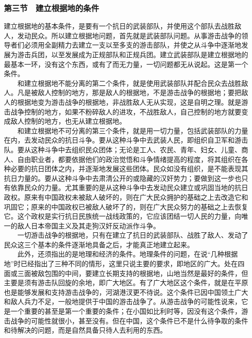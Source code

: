 \documentclass[cn,11pt,chinese]{elegantbook}
\def\myformat#1{\hfil\hfil #1}
\begin{document}
\subsubsection*{\myformat{第三节　建立根据地的条件}}
建立根据地的基本条件，是要有一个抗日的武装部队，并使用这个部队去战胜敌人，发动民众。所以建立根据地问题，首先就是武装部队问题。从事游击战争的领导者们必须用全副精力去建立一支以至多支的游击部队，并使之从斗争中逐渐地发展为游击兵团，以至发展成为正规部队和正规兵团。建立武装部队是建立根据地的最基本一环，没有这个东西，或有了而无力量，一切问题都无从说起。这是第一个条件。\\
　　和建立根据地不能分离的第二个条件，就是使用武装部队并配合民众去战胜敌人。凡是被敌人控制的地方，那是敌人的根据地，不是游击战争的根据地；要把敌人的根据地变为游击战争的根据地，非战胜敌人无从实现，这是自明之理。就是游击战争控制的地方，如果不粉碎敌人的进攻，不战胜敌人，自己控制的地方就要变成敌人控制的地方，也无从建立根据地。\\
　　和建立根据地不可分离的第三个条件，就是用一切力量，包括武装部队的力量在内，去发动民众的抗日斗争。要从这种斗争中去武装人民，即组织自卫军和游击队。要从这种斗争中去组织民众团体；无论是工人、农民、青年、妇女、儿童、商人、自由职业者，都要依据他们的政治觉悟和斗争情绪提高的程度，将其组织在各种必要的抗日团体之内，并逐渐地发展这些团体。民众如没有组织，是不能表现其抗日力量的。要从这种斗争中去肃清公开的或隐藏的汉奸势力；要做到这一步也只有依靠民众的力量。尤其重要的是从这种斗争中去发动民众建立或巩固当地的抗日政权。原来有中国政权未被敌人破坏的，则在广大民众拥护的基础之上去改造它和巩固它；原来的中国政权已被敌人破坏了的，则在广大民众努力的基础之上去恢复它。这个政权是实行抗日民族统一战线政策的，它应该团结一切人民的力量，向唯一的敌人日本帝国主义及其走狗汉奸反动派作斗争。\\
　　一切游击战争的根据地，只有在建立了抗日的武装部队、战胜了敌人、发动了民众这三个基本的条件逐渐地具备之后，才能真正地建立起来。\\
　　此外，还须指出的是地理和经济的条件。地理条件的问题，在说“几种根据地”时已经指出了三种不同的情形，这里只说主要的要求，即地区的广大。处在四面或三面被敌包围的中间，要建立长期支持的根据地，山地当然是最好的条件，但主要是须有游击队回旋的余地，即广大地区。有了广大地区这个条件，就是在平原也是能够发展和支持游击战争的，河湖港汊更不待说。这个条件已因中国领土广大和敌人兵力不足，一般地提供于中国的游击战争了。从游击战争的可能性说来，它是一个重要的甚至是第一个重要的条件；在小国如比利时等，因没有这个条件，游击战争的可能性就很小，甚至没有。但在中国，这个条件已不是什么待争取的条件和待解决的问题，而是自然具备只待人去利用的东西。\\
\end{document}
